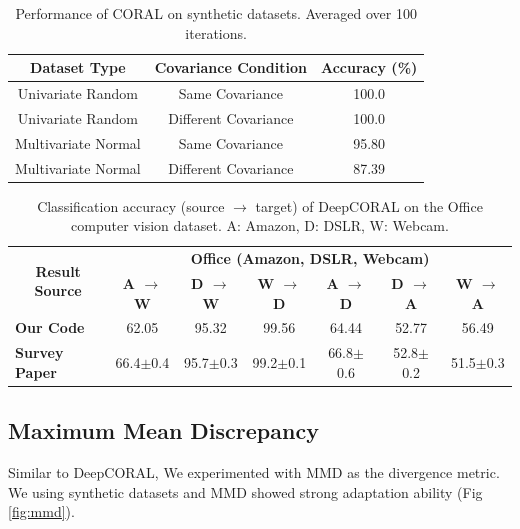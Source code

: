 \documentclass{article}
\begin{document}
\begin{table}
  \centering
  \caption{Performance of CORAL on synthetic datasets. Averaged over 100 iterations.}
  \label{tab:coral}
  \begin{tabular}{ccc}
    \toprule
    \textbf{Dataset Type} & \textbf{Covariance Condition} & \textbf{Accuracy (\%)} \\
    \midrule
    Univariate Random & Same Covariance & 100.0 \\
    Univariate Random & Different Covariance & 100.0 \\
    Multivariate Normal & Same Covariance & 95.80 \\
    Multivariate Normal & Different Covariance & 87.39 \\
    \bottomrule
  \end{tabular}
\end{table}

\begin{table}
  \caption{Classification accuracy (source $\rightarrow$ target) of DeepCORAL on the Office computer vision dataset. A: Amazon, D: DSLR, W: Webcam.}
  \label{comparePerformance2}
  \begin{scriptsize}
  \begin{center}
  {\renewcommand{\arraystretch}{1.4}
  \begin{tabular}{@{}l cccccc@{}}
  \toprule
  \multicolumn{1}{c}{\multirow{2}{*}{\textbf{Result Source}}} & \multicolumn{6}{c}{\textbf{Office (Amazon, DSLR, Webcam)}} \\
  \cmidrule{2-7}
   & \textbf{A $\rightarrow$ W} & \textbf{D $\rightarrow$ W} & \textbf{W $\rightarrow$ D} & \textbf{A $\rightarrow$ D} & \textbf{D $\rightarrow$ A} & \textbf{W $\rightarrow$ A} \\
  \midrule
  \textbf{Our Code} & 62.05 & 95.32 & 99.56 & 64.44 & 52.77 & 56.49\\
  \hline
  \textbf{Survey Paper} & 66.4$\pm$0.4 & 95.7$\pm$0.3 & 99.2$\pm$0.1 & 66.8$\pm$0.6 & 52.8$\pm$0.2 & 51.5$\pm$0.3\\
  \bottomrule
  \end{tabular}
  }
  \end{center}
  \end{scriptsize}
  \label{tab:deepcoral}
\end{table}

\subsection{Maximum Mean Discrepancy}
Similar to DeepCORAL\cite{DeepCoral}, We experimented with MMD\cite{sutherland2017generative} as the divergence metric. We using synthetic datasets and MMD showed strong adaptation ability (Fig \ref{fig:mmd}). 
\end{document}

